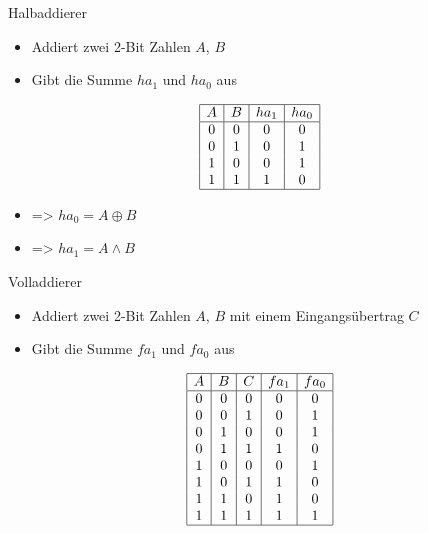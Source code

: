 \documentclass[
  german,            %
  aspectratio=169,    %
]{tumbeamer}
\begin{document}
\begin{frame}[c, fragile]{Halbaddierer}{}
  \centering
  \begin{itemize}
    \item Addiert zwei 2-Bit Zahlen $A$, $B$
    \item Gibt die Summe $ha_1$ und $ha_0$ aus
  \end{itemize}
  \vspace{0.2cm}
      \[
        \begin{array}{|c|c|c|c|}
          \hline
          A & B & ha_1 & ha_0 \\
          \hline
          0 & 0 & 0 & 0       \\
          0 & 1 & 0 & 1       \\
          1 & 0 & 0 & 1       \\
          1 & 1 & 1 & 0       \\
          \hline
        \end{array}
      \]
      \begin{itemize}
        \item => $ha_0 = A \oplus B $
        \item => $ha_1 = A \wedge B $
      \end{itemize}
\end{frame}

\begin{frame}[c, fragile]{Volladdierer}{}
  \centering
  \begin{itemize}
    \item Addiert zwei 2-Bit Zahlen $A$, $B$ mit einem Eingangsübertrag $C$
    \item Gibt die Summe $fa_1$ und $fa_0$ aus
  \end{itemize}
  \vspace{0.2cm}
      \[
        \begin{array}{|c|c|c|c|c|}
          \hline
          A & B & C & fa_1 & fa_0 \\
          \hline
          0 & 0 & 0 & 0 & 0       \\
          0 & 0 & 1 & 0 & 1       \\
          0 & 1 & 0 & 0 & 1       \\
          0 & 1 & 1 & 1 & 0       \\
          1 & 0 & 0 & 0 & 1       \\
          1 & 0 & 1 & 1 & 0       \\
          1 & 1 & 0 & 1 & 0       \\
          1 & 1 & 1 & 1 & 1       \\
          \hline
        \end{array}
      \]
\end{frame}
\end{document}
